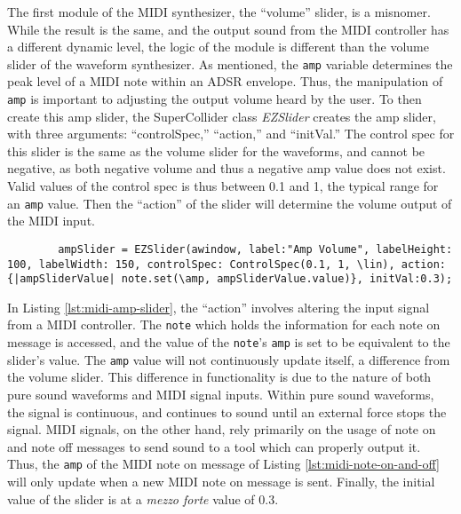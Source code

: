 The first module of the MIDI synthesizer, the ``volume'' slider, is a misnomer. While the result is the same, and the output sound from the MIDI controller has a different dynamic level, the logic of the module is different than the volume slider of the waveform synthesizer. As mentioned, the \texttt{amp} variable determines the peak level of a MIDI note within an ADSR envelope. Thus, the manipulation of \texttt{amp} is important to adjusting the output volume heard by the user. To then create this amp slider, the SuperCollider class \textit{EZSlider} creates the amp slider, with three arguments: ``controlSpec,'' ``action,'' and ``initVal.'' The control spec for this slider is the same as the volume slider for the waveforms, and cannot be negative, as both negative volume and thus a negative amp value does not exist. Valid values of the control spec is thus between 0.1 and 1, the typical range for an \texttt{amp} value. Then the ``action'' of the slider will determine the volume output of the MIDI input. 

\begin{listing}
	\begin{lstlisting}
		ampSlider = EZSlider(awindow, label:"Amp Volume", labelHeight: 100, labelWidth: 150, controlSpec: ControlSpec(0.1, 1, \lin), action:{|ampSliderValue| note.set(\amp, ampSliderValue.value)}, initVal:0.3);
	\end{lstlisting}	
	\caption{Creating the amp slider for MIDI}
	\label{lst:midi-amp-slider}
\end{listing}

In Listing \ref{lst:midi-amp-slider}, the ``action'' involves altering the input signal from a MIDI controller. The \texttt{note} which holds the information for each note on message is accessed, and the value of the \texttt{note}'s \texttt{amp} is set to be equivalent to the slider's value. The \texttt{amp} value will not continuously update itself, a difference from the volume slider. This difference in functionality is due to the nature of both pure sound waveforms and MIDI signal inputs. Within pure sound waveforms, the signal is continuous, and continues to sound until an external force stops the signal. MIDI signals, on the other hand, rely primarily on the usage of note on and note off messages to send sound to a tool which can properly output it. Thus, the \texttt{amp} of the MIDI note on message of Listing \ref{lst:midi-note-on-and-off} will only update when a new MIDI note on message is sent. Finally, the initial value of the slider is at a \textit{mezzo forte} value of 0.3.

